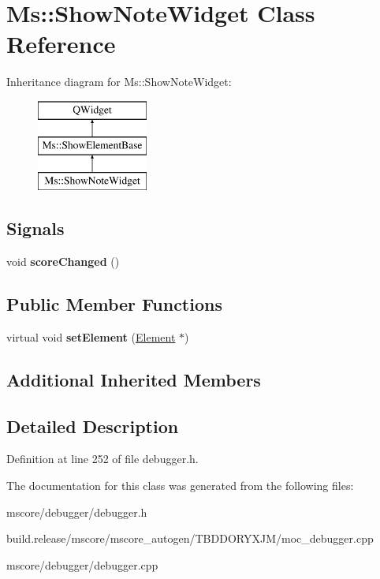 \hypertarget{class_ms_1_1_show_note_widget}{}\section{Ms\+:\+:Show\+Note\+Widget Class Reference}
\label{class_ms_1_1_show_note_widget}
Inheritance diagram for Ms\+:\+:Show\+Note\+Widget\+:\begin{figure}[H]
\begin{center}
\leavevmode
\includegraphics[height=3.000000cm]{class_ms_1_1_show_note_widget}
\end{center}
\end{figure}
\subsection*{Signals}
\begin{DoxyCompactItemize}
\item 
\mbox{\label{class_ms_1_1_show_note_widget_a7024a3de1cf15c6081d045d5e050dc3d}} 
void {\bfseries score\+Changed} ()
\end{DoxyCompactItemize}
\subsection*{Public Member Functions}
\begin{DoxyCompactItemize}
\item 
\mbox{\label{class_ms_1_1_show_note_widget_a2b1a70b7c6fd5851a6d2347f4b07827d}} 
virtual void {\bfseries set\+Element} (\hyperlink{class_ms_1_1_element}{Element} $\ast$)
\end{DoxyCompactItemize}
\subsection*{Additional Inherited Members}


\subsection{Detailed Description}


Definition at line 252 of file debugger.\+h.



The documentation for this class was generated from the following files\+:\begin{DoxyCompactItemize}
\item 
mscore/debugger/debugger.\+h\item 
build.\+release/mscore/mscore\+\_\+autogen/\+T\+B\+D\+D\+O\+R\+Y\+X\+J\+M/moc\+\_\+debugger.\+cpp\item 
mscore/debugger/debugger.\+cpp\end{DoxyCompactItemize}

